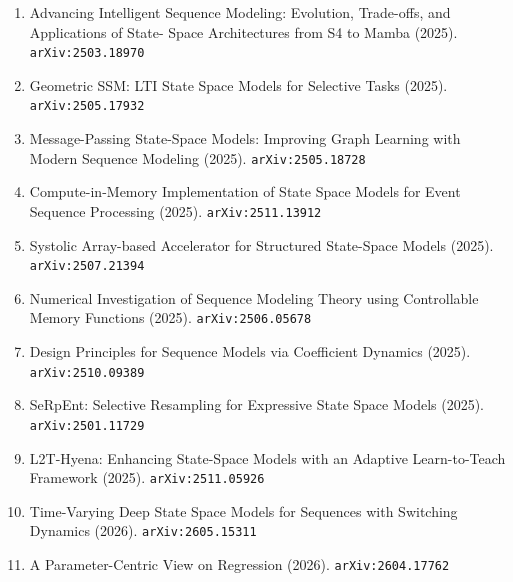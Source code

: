 \documentclass[11pt]{article}
\begin{document}
\begin{enumerate}
  \item Advancing Intelligent Sequence Modeling: Evolution, Trade-offs, and Applications of State- Space Architectures from S4 to Mamba (2025). \texttt{arXiv:2503.18970}
  \item Geometric SSM: LTI State Space Models for Selective Tasks (2025). \texttt{arXiv:2505.17932}
  \item Message-Passing State-Space Models: Improving Graph Learning with Modern Sequence Modeling (2025). \texttt{arXiv:2505.18728}
  \item Compute-in-Memory Implementation of State Space Models for Event Sequence Processing (2025). \texttt{arXiv:2511.13912}
  \item Systolic Array-based Accelerator for Structured State-Space Models (2025). \texttt{arXiv:2507.21394}
  \item Numerical Investigation of Sequence Modeling Theory using Controllable Memory Functions (2025). \texttt{arXiv:2506.05678}
  \item Design Principles for Sequence Models via Coefficient Dynamics (2025). \texttt{arXiv:2510.09389}
  \item SeRpEnt: Selective Resampling for Expressive State Space Models (2025). \texttt{arXiv:2501.11729}
  \item L2T-Hyena: Enhancing State-Space Models with an Adaptive Learn-to-Teach Framework (2025). \texttt{arXiv:2511.05926}
  \item Time-Varying Deep State Space Models for Sequences with Switching Dynamics (2026). \texttt{arXiv:2605.15311}
  \item A Parameter-Centric View on Regression (2026). \texttt{arXiv:2604.17762}
\end{enumerate}
\end{document}
